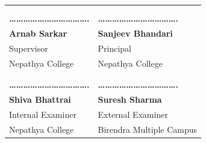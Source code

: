 \vspace{1cm}


\begin{table}[h]
    \centering
    \noindent
    \begin{tabularx}{\textwidth} { 
        | >{\centering\arraybackslash}X
        | >{\centering\arraybackslash}X | }
        \hline
        & \\
        & \\

        \textbf{…………………………….}      &      \textbf{…………………………….}      \\  
        \textbf{Arnab Sarkar}      &      \textbf{Sanjeev Bhandari}  \\  
        Supervisor                 &      Principal                  \\  
        Nepathya College           &      Nepathya College           \\  

        \hline
        & \\
        & \\

        \textbf{…………………………….}      &      \textbf{…………………………….}      \\  
        \textbf{Shiva Bhattrai}    &      \textbf{Suresh Sharma}     \\  
        Internal Examiner          &      External Examiner          \\  
        Nepathya College           &      Birendra Multiple Campus   \\  

        \hline
    \end{tabularx}
\end{table}

\pagebreak
